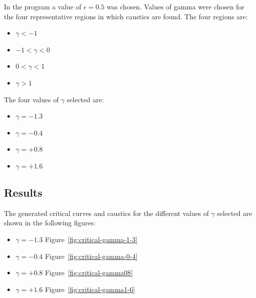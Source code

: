 \documentclass[a4paper]{IEEEtran}
\begin{document}
    In the program a value of $\epsilon = 0.5$ was chosen. Values
    of gamma were chosen for the four representative regions in which
    caustics are found. The four regions are:
    \begin{itemize}
        \item $\gamma < -1$
        \item $-1 < \gamma < 0$
        \item $0 < \gamma < 1$
        \item $\gamma > 1$
    \end{itemize}
    The four values of $\gamma$ selected are:
    \begin{itemize}
        \item $\gamma = -1.3$ 
        \item $\gamma = -0.4$
        \item $\gamma = +0.8$
        \item $\gamma = +1.6$
    \end{itemize}

    \subsection{Results}
    The generated critical curves and caustics for the different values of $\gamma$ selected 
    are shown in the following figures:
    \begin{itemize}
        \item $\gamma = -1.3$ Figure~\ref{fig:critical-gamma-1-3} 
        \item $\gamma = -0.4$ Figure~\ref{fig:critical-gamma-0-4}
        \item $\gamma = +0.8$ Figure~\ref{fig:critical-gamma08} 
        \item $\gamma = +1.6$ Figure~\ref{fig:critical-gamma1-6}
    \end{itemize} 
   
\end{document}
